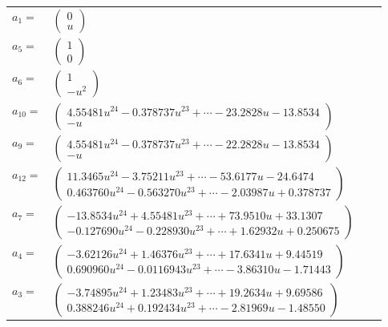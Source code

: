 \documentclass[1p]{elsarticle_modified}
\theoremstyle{definition}
\begin{document}
\begin{tabular}{m{7pt} m{180pt} m{7pt} m{180pt} }
\flushright $a_{1}=$&$\begin{pmatrix}0\\u\end{pmatrix}$ \\
\flushright $a_{5}=$&$\begin{pmatrix}1\\0\end{pmatrix}$ \\
\flushright $a_{6}=$&$\begin{pmatrix}1\\- u^2\end{pmatrix}$ \\
\flushright $a_{10}=$&$\begin{pmatrix}4.55481 u^{24}-0.378737 u^{23}+\cdots-23.2828 u-13.8534\\- u\end{pmatrix}$ \\
\flushright $a_{9}=$&$\begin{pmatrix}4.55481 u^{24}-0.378737 u^{23}+\cdots-22.2828 u-13.8534\\- u\end{pmatrix}$ \\
\flushright $a_{12}=$&$\begin{pmatrix}11.3465 u^{24}-3.75211 u^{23}+\cdots-53.6177 u-24.6474\\0.463760 u^{24}-0.563270 u^{23}+\cdots-2.03987 u+0.378737\end{pmatrix}$ \\
\flushright $a_{7}=$&$\begin{pmatrix}-13.8534 u^{24}+4.55481 u^{23}+\cdots+73.9510 u+33.1307\\-0.127690 u^{24}-0.228930 u^{23}+\cdots+1.62932 u+0.250675\end{pmatrix}$ \\
\flushright $a_{4}=$&$\begin{pmatrix}-3.62126 u^{24}+1.46376 u^{23}+\cdots+17.6341 u+9.44519\\0.690960 u^{24}-0.0116943 u^{23}+\cdots-3.86310 u-1.71443\end{pmatrix}$ \\
\flushright $a_{3}=$&$\begin{pmatrix}-3.74895 u^{24}+1.23483 u^{23}+\cdots+19.2634 u+9.69586\\0.388246 u^{24}+0.192434 u^{23}+\cdots-2.81969 u-1.48550\end{pmatrix}$ \\

\end{tabular}
\end{document}
